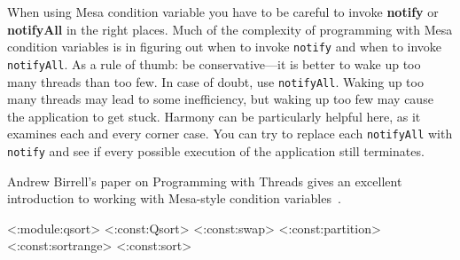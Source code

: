 \documentclass{report}
\begin{document}
{%
When using Mesa condition variable you have to be careful to invoke
\textbf{notify} or \textbf{notifyAll} in the right places.
Much of the complexity of programming with Mesa condition variables
is in figuring out when to invoke \texttt{notify} and when to invoke
\texttt{notifyAll}.  As a rule of thumb: be conservative---it is
better to wake up too many threads than too few.
In case of doubt, use \texttt{notifyAll}.
Waking up too
many threads may lead to some inefficiency, but waking up too few
may cause the application to get stuck.  Harmony can be particularly
helpful here, as it examines each and every corner case.
You can try to replace each \texttt{notifyAll} with \texttt{notify} and see
if every possible execution of the application still terminates.

Andrew Birrell's paper on Programming with Threads gives an excellent
introduction to working with Mesa-style condition variables~\cite{Birrell89}.

<{:module:qsort}>
<{:const:Qsort}>
<{:const:swap}>
<{:const:partition}>
<{:const:sortrange}>
<{:const:sort}>

}
\end{document}
